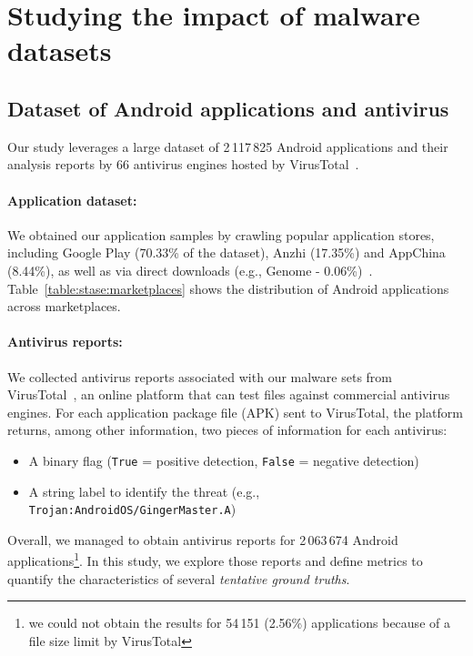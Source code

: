 \section{Studying the impact of malware datasets}
\subsection{Dataset of Android applications and antivirus}
Our study leverages a large dataset of 2\,117\,825 Android applications and their analysis reports by 66 antivirus engines hosted by VirusTotal~\cite{noauthor_virustotal_nodate}.
\paragraph{Application dataset:}
We obtained our application samples by crawling popular application stores, including Google Play (70.33\% of the dataset), Anzhi (17.35\%) and AppChina (8.44\%), as well as via direct downloads (e.g., Genome - 0.06\%)~\cite{allix_androzoo:_2016}.
Table~\ref{table:stase:marketplaces} shows the distribution of Android applications across marketplaces.



\paragraph{Antivirus reports:}
We collected antivirus reports associated with our malware sets from VirusTotal~\cite{noauthor_virustotal_nodate}, an online platform that can test files against commercial antivirus engines.
For each application package file (APK) sent to VirusTotal, the platform returns, among other information, two pieces of information for each antivirus:

\begin{itemize}
	\item A binary flag (\texttt{True} = positive detection, \texttt{False} = negative detection)
	\item A string label to identify the threat (e.g., \texttt{Trojan:AndroidOS/GingerMaster.A})
\end{itemize}

Overall, we managed to obtain antivirus reports for 2\,063\,674 Android applications\footnote{we could not obtain the results for 54\,151 (2.56\%) applications because of a file size limit by VirusTotal}.
In this study, we explore those reports and define metrics to quantify the characteristics of several \emph{tentative ground truths}.
